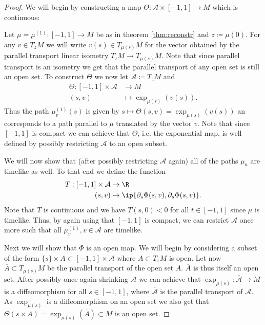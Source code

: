 \begin{proof}
We will begin by constructing a map $\Theta:\mathcal{A}\times[-1,1] \to M$ which is continuous:

Let $\mu=\mu^{(1)}:[-1,1]\to M$ be as in theorem \ref{thm:reconstr} and $z\coloneqq\mu(0)$. For any $v\in T_zM$ we will write $v(s) \in T_{\mu(s)}M$ for the vector obtained by the parallel transport linear isometry $T_zM\to T_{\mu(s)}M$. Note that since parallel transport is an isometry we get that the parallel transport of any open set is still an open set.
To construct $\Theta$ we now let $\mathcal{A}\coloneqq T_zM$ and 
\begin{align*}
    \Theta: [-1,1]\times\mathcal{A} &\to M\\
    (s,v) &\mapsto \exp_{\mu(s)}(v(s)).
\end{align*}
Thus the path $\mu_v^{(1)}(s)$ is given by $s\mapsto \Theta(s,v) = \exp_{\mu(s)}(v(s))$ an corresponds to a path parallel to $\mu$ translated by the vector $v$.
Note that since $[-1,1]$ is compact we can achieve that $\Theta$, i.e. the exponential map, is well defined by possibly restricting $\mathcal{A}$ to an open subset.

We will now show that (after possibly restricting $\mathcal{A}$ again) all of the paths $\mu_a$ are timelike as well. 
To that end we define the function 
\begin{align*}
    T: [-1,1]\times\mathcal{A} &\to \R\\
    (s,v) &\mapsto \ip{\partial_s\Phi(s,v),\partial_s\Phi(s,v)}.
\end{align*}
Note that $T$ is continuous and we have $T(s,0) < 0$ for all $t\in [-1,1]$ since $\mu$ is timelike. Thus, by again using that $[-1,1]$ is compact, we can restrict $\mathcal{A}$ once more such that all $\mu_v^{(1)}, v\in \mathcal{A}$ are timelike.

Next we will show that $\Phi$ is an open map. We will begin by considering a subset of the form $\{s\}\times A \subset [-1,1]\times \mathcal{A}$ where $A\subset T_zM$ is open. Let now $\overline{A}\subset T_{\mu(s)}M$ be the parallel transport of the open set $A$. $\overline{A}$ is thus itself an open set. After possibly once again shrinking $\mathcal{A}$ we can achieve that $\exp_{\mu(s)}:\overline{\mathcal{A}}\to M$ is a diffeomorphism for all $s\in [-1,1]$, where $\overline{\mathcal{A}}$ is the parallel transport of $\mathcal{A}$.
As $\exp_{\mu(s)}$ is a diffeomorphism on an open set we also get that $\Theta({s}\times A) = \exp_{\mu(s)}(\overline{A})\subset M$ is an open set.


\end{proof}
